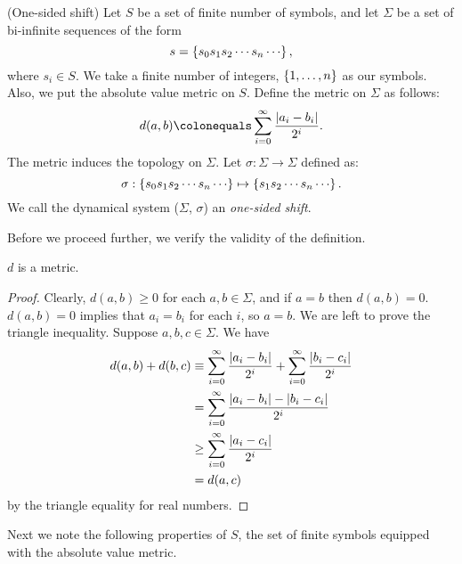 \documentclass[10pt,twoside]{book}
\begin{document}
\begin{definition}
  (One-sided shift)
  Let $S$ be a set of finite number of symbols, and let $\Sigma$ be a set of bi-infinite sequences of the form
  \begin{equation*}
    s = \set{ s_0 s_1 s_2 \cdots s_n \cdots },
  \end{equation*}
  where $s_i \in S$.
  We take a finite number of integers, $\left \{ 1, \ldots, n \right \}$ as our symbols.
  Also, we put the absolute value metric on $S$.
  Define the metric on $\Sigma$ as follows:
  \begin{equation*}
    d(a,b) \ceq \sum\limits_{i = 0}^{\infty} \frac{\abs{a_i - b_i}}{2^i}.
  \end{equation*}
  The metric induces the topology on $\Sigma$.
  Let $\sigma: \Sigma \to \Sigma$ defined as:
  \begin{equation*}
    \sigma: \set{ s_0 s_1 s_2 \cdots s_n \cdots } 
    \mapsto 
    \set{ s_1 s_2 \cdots s_n \cdots }.
  \end{equation*}
  We call the dynamical system ($\Sigma$, $\sigma$) an \textit{one-sided shift}.
\end{definition}
Before we proceed further, we verify the validity of the definition.
\begin{proposition}
  $d$ is a metric.
  \label{prop:symb-metric}
  \begin{proof}
    Clearly, $d(a,b) \geq 0$ for each $a,b \in \Sigma$, and if $a = b$ then $d(a,b) = 0$.
    $d(a,b) = 0$ implies that $a_i = b_i$ for each $i$, so $a = b$.
    We are left to prove the triangle inequality.
    Suppose $a,b,c \in \Sigma$.
    We have
    \begin{align*}
      d(a,b) + d(b,c)
      &\equiv \sum\limits_{i = 0}^{\infty} \frac{\left | a_i - b_i \right |}{2^i}  +  \sum\limits_{i = 0}^{\infty} \frac{\left | b_i - c_i \right |}{2^i}  \\
      &= \sum\limits_{i = 0}^{\infty} \frac{\left | a_i - b_i \right | - \left | b_i - c_i \right |}{2^i}  \\
      &\geq \sum\limits_{i = 0}^{\infty} \frac{\left | a_i - c_i \right |}{2^i}  \\
      &= d(a,c)
    \end{align*}
    by the triangle equality for real numbers.
  \end{proof}
\end{proposition}
Next we note the following properties of $S$, the set of finite symbols equipped with the absolute value metric.
\end{document}
